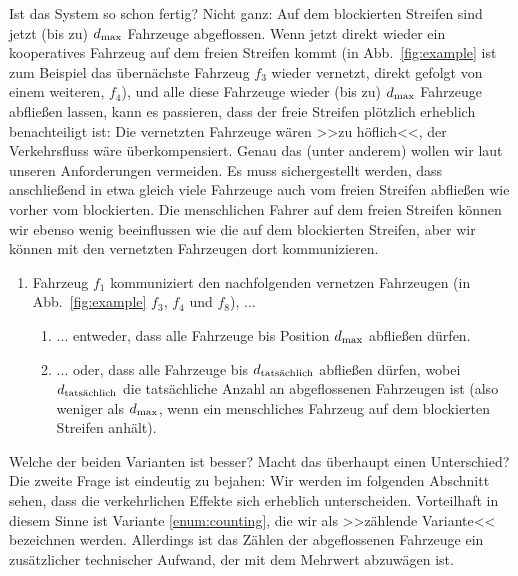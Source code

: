 Ist das System so schon fertig? Nicht ganz: Auf dem blockierten Streifen sind jetzt (bis zu) $\dmax$ Fahrzeuge abgeflossen. Wenn jetzt direkt wieder ein kooperatives Fahrzeug auf dem freien Streifen kommt (in Abb.~\ref{fig:example} ist zum Beispiel das übernächste Fahrzeug $f_3$ wieder vernetzt, direkt gefolgt von einem weiteren, $f_4$), und alle diese Fahrzeuge wieder (bis zu) $\dmax$ Fahrzeuge abfließen lassen, kann es passieren, dass der freie Streifen plötzlich erheblich benachteiligt ist: Die vernetzten Fahrzeuge wären >>zu höflich<<, der Verkehrsfluss wäre überkompensiert. Genau das (unter anderem) wollen wir laut unseren Anforderungen vermeiden. Es muss sichergestellt werden, dass anschließend in etwa gleich viele Fahrzeuge auch vom freien Streifen abfließen wie vorher vom blockierten. Die menschlichen Fahrer auf dem freien Streifen können wir ebenso wenig beeinflussen wie die auf dem blockierten Streifen, aber wir können mit den vernetzten Fahrzeugen dort kommunizieren.

\begin{enumerate}[resume]
	\item Fahrzeug $f_1$ kommuniziert den nachfolgenden vernetzen Fahrzeugen (in Abb.~\ref{fig:example} $f_3$, $f_4$ und $f_8$), ... 
	\begin{enumerate}
		\item \label{enum:non-counting}... entweder, dass alle Fahrzeuge bis Position $\dmax$ abfließen dürfen.
		\item \label{enum:counting} ... oder, dass alle Fahrzeuge bis $\dtats$ abfließen dürfen, wobei $\dtats$ die tatsächliche Anzahl an abgeflossenen Fahrzeugen ist (also weniger als $\dmax$, wenn ein menschliches Fahrzeug auf dem blockierten Streifen anhält).
	\end{enumerate}
\end{enumerate}

Welche der beiden Varianten ist besser? Macht das überhaupt einen Unterschied? Die zweite Frage ist eindeutig zu bejahen: Wir werden im folgenden Abschnitt  sehen, dass die verkehrlichen Effekte sich erheblich unterscheiden. Vorteilhaft in diesem Sinne ist Variante \ref{enum:counting}, die wir als >>zählende Variante<< bezeichnen werden. Allerdings ist das Zählen der abgeflossenen Fahrzeuge ein zusätzlicher technischer Aufwand, der mit dem Mehrwert abzuwägen ist.

